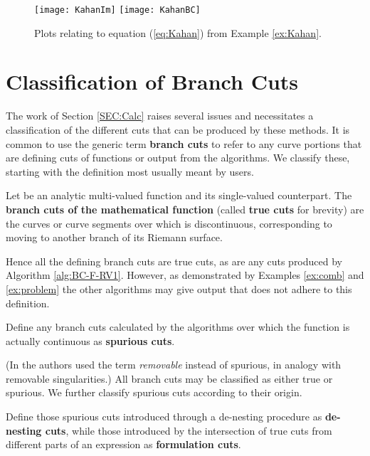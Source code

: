 \documentclass{llncs}
\begin{document}
\begin{figure}[ht] 
\begin{center}
\texttt{[image: KahanIm]}
\hspace*{0.3cm}
\texttt{[image: KahanBC]}
\end{center}
\caption{Plots relating to equation (\ref{eq:Kahan}) from Example \ref{ex:Kahan}.} 
\label{fig:Kahan}
\end{figure}


\section{Classification of Branch Cuts} 
\label{SEC:Types}

The work of Section \ref{SEC:Calc} raises several issues and necessitates a classification of the different cuts that can be produced by these methods.  It is common to use the generic term \textbf{branch cuts} to refer to any curve portions that are defining cuts of functions or output from the algorithms.  We classify these, starting with the definition most usually meant by users.

\begin{definition}
Let  be an analytic multi-valued function and  its single-valued counterpart.  The \textbf{branch cuts of the mathematical function} (called \textbf{true cuts} for brevity) are the curves or curve segments over which  is discontinuous, corresponding to  moving to another branch of its Riemann surface.  
\end{definition}

Hence all the defining branch cuts are true cuts, as are any cuts produced by Algorithm \ref{alg:BC-F-RV1}.  However, as demonstrated by Examples \ref{ex:comb} and \ref{ex:problem} the other algorithms may give output that does not adhere to this definition.

\begin{definition}
Define any branch cuts calculated by the algorithms over which the function is actually continuous as \textbf{spurious cuts}.
\end{definition}

(In \cite{DF94} the authors used the term {\em removable} instead of spurious, in analogy with removable singularities.)  All branch cuts may be classified as either true or spurious.  We further classify spurious cuts according to their origin.

\begin{definition}
\label{def:spurioustypes}
Define those spurious cuts introduced through a de-nesting procedure as \textbf{de-nesting cuts}, while those introduced by the intersection of true cuts from different parts of an expression as \textbf{formulation cuts}.
\end{definition}
\end{document}
